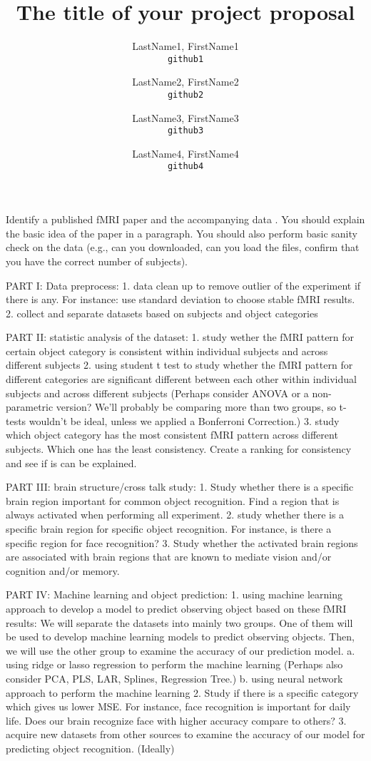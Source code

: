 \documentclass[11pt]{article}
\title{The title of your project proposal}
\author{
  LastName1, FirstName1\\
  \texttt{github1}
  \and
  LastName2, FirstName2\\
  \texttt{github2}
  \and
  LastName3, FirstName3\\
  \texttt{github3}
  \and
  LastName4, FirstName4\\
  \texttt{github4}
}
\begin{document}
\maketitle

Identify a published fMRI paper and the accompanying data
\cite{lindquist2008statistical}.  You should explain the basic idea of the
paper in a paragraph.  You should also perform basic sanity check on the data
(e.g., can you downloaded, can you load the files, confirm that you have the
correct number of subjects).



PART I: Data preprocess:
1. data clean up to remove outlier of the experiment if there is any.
For instance: use standard deviation to choose stable fMRI results.
2. collect and separate datasets based on subjects and object categories

PART II: statistic analysis of the dataset:
1. study wether the fMRI pattern for certain object category is consistent 
within individual subjects and across different subjects
2. using student t test to study whether the fMRI pattern for different 
categories are significant different between each other within individual 
subjects and across different subjects (Perhaps consider ANOVA or a non-
parametric version? We'll probably be comparing more than two groups, 
so t-tests wouldn't be ideal, unless we applied a Bonferroni Correction.)
3. study which object category has the most consistent fMRI pattern across 
different subjects. Which one has the least consistency. 
Create a ranking for consistency and see if is can be explained.

PART III: brain structure/cross talk study:
1. Study whether there is a specific brain region important for common 
object recognition. Find a region that is always activated when 
performing all experiment.
2. study whether there is a specific brain region for specific object 
recognition. For instance, is there a specific region for face recognition?
3. Study whether the activated brain regions are associated with brain 
regions that are known to mediate vision and/or cognition and/or memory.

PART IV: Machine learning and object prediction:
1. using machine learning approach to develop a model to predict observing 
object based on these fMRI results:
We will separate the datasets into mainly two groups. One of them will 
be used to develop machine learning models to predict observing objects. 
Then, we will use the other group to examine the accuracy of our 
prediction model.
a. using ridge or lasso regression to perform the machine learning 
(Perhaps also consider PCA, PLS, LAR, Splines, Regression Tree.)
b. using neural network approach to perform the machine learning
2. Study if there is a specific category which gives us lower MSE. 
For instance, face recognition is important for daily life. 
Does our brain recognize face with higher accuracy compare to others?
3. acquire new datasets from other sources to examine the accuracy of 
our model for predicting object recognition. (Ideally)
 


\end{document}
